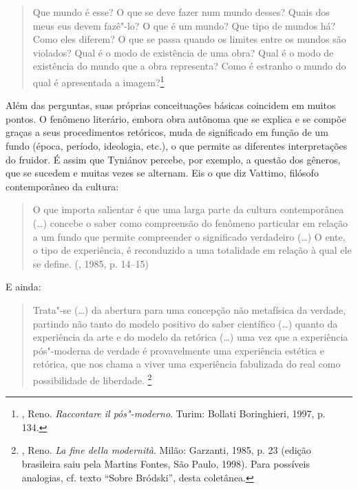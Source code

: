 {{{\begin{quote}
Que mundo é esse? O que se deve fazer num mundo desses? Quais dos meus
eus devem fazê"-lo? O que é um mundo? Que tipo de mundos há? Como eles
diferem? O que se passa quando os limites entre os mundos são violados?
Qual é o modo de existência de uma obra? Qual é o modo de existência do
mundo que a obra representa? Como é estranho o mundo do qual é
apresentada a imagem?\footnote{, Reno. 
\emph{Raccontare il pós"-moderno}. Turim: Bollati Boringhieri, 1997,
 p. 134.}
\end{quote}

Além das perguntas, suas próprias conceituações básicas coincidem em
muitos pontos. O fenômeno literário, embora obra autônoma que se explica
e se compõe graças a seus procedimentos retóricos, muda de
significado em função de um fundo (época, período, ideologia, etc.), o
que permite as diferentes interpretações do fruidor. É assim que
Tyniánov percebe, por exemplo, a questão dos gêneros, que se sucedem e muitas
vezes se alternam. Eis o que diz Vattimo, filósofo contemporâneo da cultura:

\begin{quote}
O que importa salientar é que uma larga parte da cultura contemporânea
(\ldots{}) concebe o saber como compreensão do fenômeno particular em
relação a um fundo que permite compreender o significado verdadeiro
(\ldots{}) O ente, o tipo de experiência, é reconduzido a uma
totalidade em relação à qual ele se define. (, 1985, p. 14--15)
\end{quote}

E ainda:

\begin{quote}
Trata"-se (\ldots{}) da abertura para uma concepção não metafísica da
verdade, partindo não tanto do modelo positivo do saber científico
(\ldots{}) quanto da experiência da arte e do modelo da retórica (\ldots{}) uma vez que a experiência pós"-moderna de verdade é
provavelmente uma experiência estética e retórica, que nos chama a viver
uma experiência fabulizada do real como possibilidade de liberdade.
\footnote{, Reno. \emph{La fine della modernità}. Milão:
 Garzanti, 1985, p. 23 (edição brasileira saiu pela Martins Fontes,
 São Paulo, 1998). Para possíveis analogias, cf. texto ``Sobre
 Bródski'', desta coletânea.}
\end{quote}

}}}
